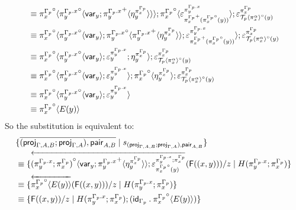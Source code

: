 \documentclass[10pt]{article}
\theoremstyle{definition}
\newcommand{\rewrite}[2]{\overleftarrow{#1}(#2)}
\newcommand\FI[1]{\ensuremath{\mathsf{F}{(#1)}}}
\newcommand\TrPlus[2]{\ensuremath{{#1}^+(#2)}}
\newcommand\TrCirc[2]{\ensuremath{{#1}^\circ(#2)}}
\newcommand\proj[1]{\ensuremath{\mathsf{proj}_{#1}}}
\newcommand\var[1]{\ensuremath{\mathsf{var}_{#1}}}
\newcommand{\id}{\mathsf{id}}
\newcommand\ApEl[2]{\mathcal{T}_{#1}\langle#2\rangle}
\newcommand\ApPlus[2]{\ensuremath{{#1}^+ \langle #2 \rangle }}
\newcommand\ApCirc[2]{\ensuremath{{#1}^\circ \langle #2 \rangle }}
\newcommand\bdot[0]{\mathbin{.}}
\begin{document}
\begin{enumerate}[style = multiline, labelwidth = 80pt]
\begin{align*}
&\equiv \ApCirc{\pi^{\asdep{\Gamma}}_x}{\ApCirc{\pi^{\asdep{\Gamma}.x}_y}{\var{y};\ApPlus{\pi^{\asdep{\Gamma}.x}_y}{\eta^{\pi^{\asdep{\Gamma}}_x}_y}}};\ApCirc{\pi^{\asdep{\Gamma}}_x}{\varepsilon^{\pi^{\asdep{\Gamma}.x}_y}_{\TrPlus{\pi^{\asdep{\Gamma}}_x}{\TrCirc{\pi^{\asdep{\Gamma}}_x}{y}}}};\varepsilon^{\pi^{\asdep{\Gamma}}_x}_{\TrCirc{\ApEl{p}{\pi^\alpha_x}}{y}} \\
&\equiv \ApCirc{\pi^{\asdep{\Gamma}}_x}{\ApCirc{\pi^{\asdep{\Gamma}.x}_y}{\var{y}};\ApCirc{\pi^{\asdep{\Gamma}.x}_y}{\ApPlus{\pi^{\asdep{\Gamma}.x}_y}{\eta^{\pi^{\asdep{\Gamma}}_x}_y}};\varepsilon^{\pi^{\asdep{\Gamma}.x}_y}_{\TrPlus{\pi^{\asdep{\Gamma}}_x}{\TrCirc{\pi^{\asdep{\Gamma}}_x}{y}}}};\varepsilon^{\pi^{\asdep{\Gamma}}_x}_{\TrCirc{\ApEl{p}{\pi^\alpha_x}}{y}} \\
&\equiv \ApCirc{\pi^{\asdep{\Gamma}}_x}{\ApCirc{\pi^{\asdep{\Gamma}.x}_y}{\var{y}};\varepsilon^{\pi^{\asdep{\Gamma}.x}_y}_y;\eta^{\pi^{\asdep{\Gamma}}_x}_y};\varepsilon^{\pi^{\asdep{\Gamma}}_x}_{\TrCirc{\ApEl{p}{\pi^\alpha_x}}{y}} \\
&\equiv \ApCirc{\pi^{\asdep{\Gamma}}_x}{\ApCirc{\pi^{\asdep{\Gamma}.x}_y}{\var{y}};\varepsilon^{\pi^{\asdep{\Gamma}.x}_y}_y}; \ApCirc{\pi^{\asdep{\Gamma}}_x}{\eta^{\pi^{\asdep{\Gamma}}_x}_y};\varepsilon^{\pi^{\asdep{\Gamma}}_x}_{\TrCirc{\ApEl{p}{\pi^\alpha_x}}{y}} \\
&\equiv \ApCirc{\pi^{\asdep{\Gamma}}_x}{\ApCirc{\pi^{\asdep{\Gamma}.x}_y}{\var{y}};\varepsilon^{\pi^{\asdep{\Gamma}.x}_y}_y} \\
&\equiv \ApCirc{\pi^{\asdep{\Gamma}}_x}{E(y)}
\end{align*}
So the substitution is equivalent to:
\begin{align*}
&\{ \upstairs{(\proj{\Gamma, A, B};\proj{\Gamma, A}), \mathsf{pair}_{A,B}} \mid s_{(\proj{\Gamma, A, B};\proj{\Gamma, A}), \mathsf{pair}_{A,B}} \} \\
&\equiv \{ \rewrite{\ApCirc{(\pi^{\asdep{\Gamma}.x}_y;\pi^{\asdep{\Gamma}}_x)}{\var{y};\ApPlus{\pi^{\asdep{\Gamma}.x}_y}{\eta^{\pi^{\asdep{\Gamma}}_x}_y}};\varepsilon^{\pi^{\asdep{\Gamma}.x}_y;\pi^{\asdep{\Gamma}}_x}_{\TrCirc{\pi^{\asdep{\Gamma}}_x}{y}}}{\FI{(x, y)}}/z \mid H(\pi^{\asdep{\Gamma}.x}_y;\pi^{\asdep{\Gamma}}_x) \} \\
&\equiv \{ \rewrite{\ApCirc{\pi^{\asdep{\Gamma}}_x}{E(y)}}{\FI{(x, y)}}/z \mid H(\pi^{\asdep{\Gamma}.x}_y;\pi^{\asdep{\Gamma}}_x) \} \\
&\equiv \{ \FI{(x, y)}/z \mid H(\pi^{\asdep{\Gamma}.x}_y;\pi^{\asdep{\Gamma}}_x) ; (\id_{\asdep{\Gamma}} \bdot \ApCirc{\pi^{\asdep{\Gamma}}_x}{E(y)}) \} \\

\end{align*}
\end{enumerate}
\end{document}
